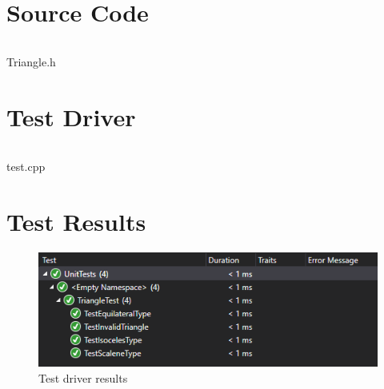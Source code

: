 \documentclass[letterpaper]{article}
\begin{document}
\section{Source Code}
\begin{listing}[H]
\inputminted[breaklines,frame=single,linenos]{cpp}{code/Triangle.h}
\caption{Triangle.h}
\label{code:triangle.h}
\end{listing}


\section{Test Driver}
\begin{listing}[H]
\inputminted[breaklines,frame=single,linenos]{cpp}{code/test.cpp}
\caption{test.cpp}
\label{code:test.cpp}
\end{listing}


\section{Test Results}
\begin{figure}[H]
    \centering
    \includegraphics[scale=.8]{figures/TestResults.PNG}
    \caption{Test driver results}
    \label{fig:testresults}
\end{figure}
\end{document}
